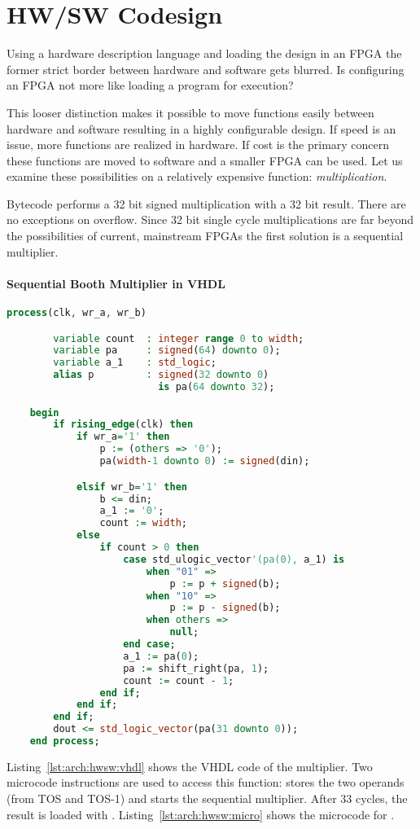 
\section{HW/SW Codesign}
\label{sec:hwsw:co}

Using a hardware description language and loading the design in an
FPGA the former strict border between hardware and software gets
blurred. Is configuring an FPGA not more like loading a program for
execution?

This looser distinction makes it possible to move functions easily
between hardware and software resulting in a highly configurable
design. If speed is an issue, more functions are realized in
hardware. If cost is the primary concern these functions are moved
to software and a smaller FPGA can be used. Let us examine these
possibilities on a relatively expensive function:
\emph{multiplication}.

Bytecode  performs a 32 bit signed multiplication with a
32 bit result. There are no exceptions on overflow. Since 32 bit
single cycle multiplications are far beyond the possibilities of
current, mainstream FPGAs the first solution is a sequential
multiplier.

\paragraph{Sequential Booth Multiplier in VHDL}

\begin{lstlisting}[float, caption={Booth multiplier in VHDL},
language=VHDL, label=lst:arch:hwsw:vhdl]
    process(clk, wr_a, wr_b)

        variable count  : integer range 0 to width;
        variable pa     : signed(64) downto 0);
        variable a_1    : std_logic;
        alias p         : signed(32 downto 0)
                          is pa(64 downto 32);

    begin
        if rising_edge(clk) then
            if wr_a='1' then
                p := (others => '0');
                pa(width-1 downto 0) := signed(din);

            elsif wr_b='1' then
                b <= din;
                a_1 := '0';
                count := width;
            else
                if count > 0 then
                    case std_ulogic_vector'(pa(0), a_1) is
                        when "01" =>
                            p := p + signed(b);
                        when "10" =>
                            p := p - signed(b);
                        when others =>
                            null;
                    end case;
                    a_1 := pa(0);
                    pa := shift_right(pa, 1);
                    count := count - 1;
                end if;
            end if;
        end if;
        dout <= std_logic_vector(pa(31 downto 0));
    end process;
\end{lstlisting}
%
Listing~\ref{lst:arch:hwsw:vhdl} shows the VHDL code of the
multiplier. Two microcode instructions are used to access this
function:  stores the two operands (from TOS and TOS-1)
and starts the sequential multiplier. After 33 cycles, the result is
loaded with . Listing~\ref{lst:arch:hwsw:micro} shows
the microcode for .

